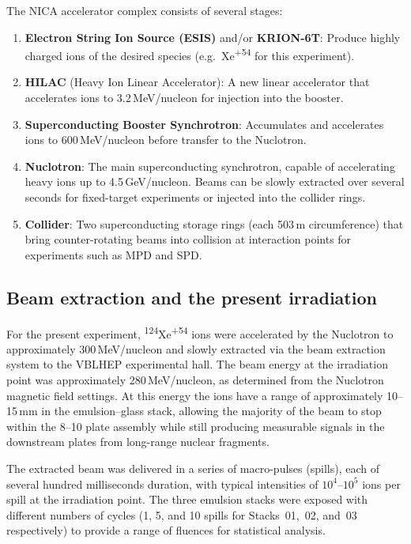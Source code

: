\documentclass[12pt,a4paper]{article}
\begin{document}
The NICA accelerator complex consists of several stages:

\begin{enumerate}
  \item \textbf{Electron String Ion Source (ESIS)} and/or
        \textbf{KRION-6T}: Produce highly charged ions of the desired
        species (e.g.\ Xe\textsuperscript{+54} for this experiment).
  \item \textbf{HILAC} (Heavy Ion Linear Accelerator): A new linear
        accelerator that accelerates ions to 3.2\,MeV/nucleon for
        injection into the booster.
  \item \textbf{Superconducting Booster Synchrotron}: Accumulates and
        accelerates ions to 600\,MeV/nucleon before transfer to the
        Nuclotron.
  \item \textbf{Nuclotron}: The main superconducting synchrotron,
        capable of accelerating heavy ions up to 4.5\,GeV/nucleon.
        Beams can be slowly extracted over several seconds for
        fixed-target experiments or injected into the collider rings.
  \item \textbf{Collider}: Two superconducting storage rings (each
        503\,m circumference) that bring counter-rotating beams into
        collision at interaction points for experiments such as
        MPD and SPD.
\end{enumerate}

\subsection{Beam extraction and the present irradiation}

For the present experiment, \textsuperscript{124}Xe\textsuperscript{+54}
ions were accelerated by the Nuclotron to approximately
300\,MeV/nucleon and slowly extracted via the beam extraction system
to the VBLHEP experimental hall. The beam energy at the irradiation
point was approximately 280\,MeV/nucleon, as determined from the
Nuclotron magnetic field settings. At this energy the ions have a
range of approximately 10--15\,mm in the emulsion--glass stack,
allowing the majority of the beam to stop within the 8--10 plate
assembly while still producing measurable signals in the downstream
plates from long-range nuclear fragments.

The extracted beam was delivered in a series of macro-pulses
(spills), each of several hundred milliseconds duration, with
typical intensities of $10^{4}$--$10^{5}$ ions per spill at the
irradiation point. The three emulsion stacks were exposed with
different numbers of cycles (1, 5, and 10 spills for Stacks~01,~02,
and~03 respectively) to provide a range of fluences for statistical
analysis.
\end{document}
